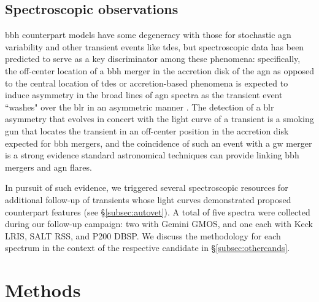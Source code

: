 \documentclass[twocolumn]{aastex631}
\newcommand{\todo}[1]{\textbf{\color{red} #1}\xspace}
\begin{document}
\subsection{Spectroscopic observations}

\gls{bbh} counterpart models have some degeneracy with those for stochastic \gls{agn} variability and other transient events like \glspl{tde}, but spectroscopic data has been predicted to serve as a key discriminator among these phenomena: specifically, the off-center location of a \gls{bbh} merger in the accretion disk of the \gls{agn} as opposed to the central location of \glspl{tde} or accretion-based phenomena is expected to induce asymmetry in the broad lines of \gls{agn} spectra as the transient event ``washes" over the \gls{blr} in an asymmetric manner \citep{mckernanRampressureStrippingKicked2019}.
The detection of a \gls{blr} asymmetry that evolves in concert with the light curve of a transient is a smoking gun that locates the transient in an off-center position in the accretion disk expected for \gls{bbh} mergers, and the coincidence of such an event with a \gls{gw} merger is a strong evidence standard astronomical techniques can provide linking \gls{bbh} mergers and \gls{agn} flares.

In pursuit of such evidence, we triggered several spectroscopic resources for additional follow-up of transients whose light curves demonstrated proposed counterpart features (see \S\ref{subsec:autovet}).
A total of five spectra were collected during our follow-up campaign: two with Gemini GMOS, and one each with Keck LRIS, SALT RSS, and P200 DBSP.
We discuss the methodology for each spectrum in the context of the respective candidate in \S\ref{subsec:othercands}.


\section{Methods}
\label{sec:vetting}
\end{document}
